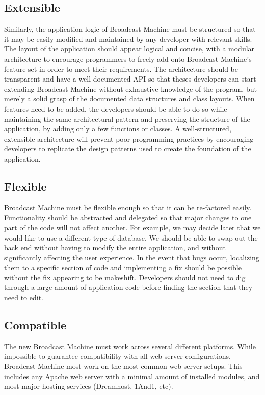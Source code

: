 \documentclass[a4paper,12pt]{report}
\begin{document}
\subsection{Extensible} 
Similarly, the application logic of Broadcast Machine must be structured so that it may be easily modified and maintained by any developer with relevant skills. 
The layout of the application should appear logical and concise, with a modular architecture to encourage programmers to freely add onto Broadcast Machine's feature set in order to meet their requirements.
The architecture should be transparent and have a well-documented API so that theses developers can start extending Broadcast Machine without exhaustive knowledge of the program, but merely a solid grasp of the documented data structures and class layouts. 
When features need to be added, the developers should be able to do so while maintaining the same architectural pattern and preserving the structure of the application, by adding only a few functions or classes. 
A well-structured, extensible architecture will prevent poor programming practices by encouraging developers to replicate the design patterns used to create the foundation of the application.


\subsection{Flexible}
Broadcast Machine must be flexible enough so that it can be re-factored easily. 
Functionality should be abstracted and delegated so that major changes to one part of the code will not affect another. 
For example, we may decide later that we would like to use a different type of database. 
We should be able to swap out the back end without having to modify the entire application, and without significantly affecting the user experience. 
In the event that bugs occur, localizing them to a specific section of code and implementing a fix should be possible without the fix appearing to be makeshift. 
Developers should not need to dig through a large amount of application code before finding the section that they need to edit. 


\subsection{Compatible}
The new Broadcast Machine must work across several different platforms. 
While impossible to guarantee compatibility with all web server configurations, Broadcast Machine most work on the most common web server setups. 
This includes any Apache web server with a minimal amount of installed modules, and most major hosting services (Dreamhost, 1And1, etc). 
\end{document}
